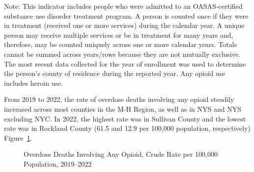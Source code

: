 \documentclass[
  english,
  letterpaper,
]{report}
\begin{document}
\begin{tcolorbox}[enhanced jigsaw, breakable, leftrule=.75mm, title=\textcolor{quarto-callout-note-color}{\faInfo}\hspace{0.5em}{Note}, bottomrule=.15mm, opacityback=0, left=2mm, colback=white, bottomtitle=1mm, coltitle=black, colbacktitle=quarto-callout-note-color!10!white, colframe=quarto-callout-note-color-frame, opacitybacktitle=0.6, toptitle=1mm, titlerule=0mm, arc=.35mm, rightrule=.15mm, toprule=.15mm]

Note: This indicator includes people who were admitted to an
OASAS-certified substance use disorder treatment program. A person is
counted once if they were in treatment (received one or more services)
during the calendar year. A unique person may receive multiple services
or be in treatment for many years and, therefore, may be counted
uniquely across one or more calendar years. Totals cannot be summed
across years/rows because they are not mutually exclusive. The most
recent data collected for the year of enrollment was used to determine
the person's county of residence during the reported year. Any opioid
use includes heroin use.

\end{tcolorbox}

From 2019 to 2022, the rate of overdose deaths involving any opioid
steadily increased across most counties in the M-H Region, as well as in
NYS and NYS excluding NYC. In 2022, the highest rate was in Sullivan
County and the lowest rate was in Rockland County (61.5 and 12.9 per
100,000 population, respectively) Figure~\ref{fig-od-anyopioid-crude}.

\begin{figure}


\caption{\label{fig-od-anyopioid-crude}Overdose Deaths Involving Any
Opioid, Crude Rate per 100,000 Population, 2019--2022}

\end{figure}%
\end{document}
